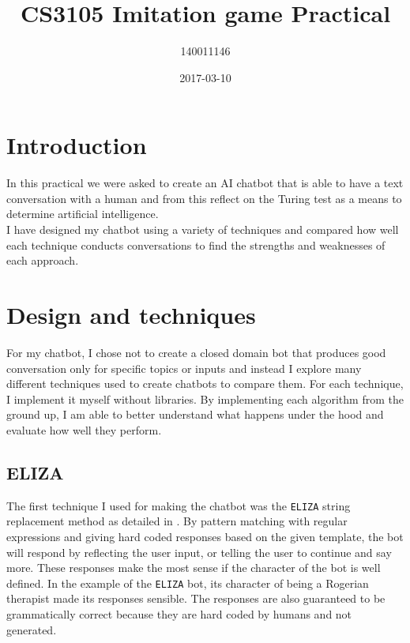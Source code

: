 \documentclass{article}
\title{CS3105 Imitation game Practical}
\date{2017-03-10}
\author{140011146}
\newcommand{\n}[0]{\\[\baselineskip]}
\begin{document}
\maketitle



\section{Introduction}
In this practical we were asked to create an AI chatbot that is able to have a text conversation with a human and from this reflect on the Turing test as a means to determine artificial intelligence.
\n
I have designed my chatbot using a variety of techniques and compared how well each technique conducts conversations to find the strengths and weaknesses of each approach.
\section{Design and techniques}
For my chatbot, I chose not to create a closed domain bot that produces good conversation only for specific topics or inputs and instead I explore many different techniques used to create chatbots to compare them. For each technique, I implement it myself without libraries. By implementing each algorithm from the ground up, I am able to better understand what happens under the hood and evaluate how well they perform.
\subsection{ELIZA}
The first technique I used for making the chatbot was the \texttt{ELIZA} string replacement method as detailed in \cite{eliza}. By pattern matching with regular expressions and giving hard coded responses based on the given template, the bot will respond by reflecting the user input, or telling the user to continue and say more. These responses make the most sense if the character of the bot is well defined. In the example of the \texttt{ELIZA} bot, its character of being a Rogerian therapist made its responses sensible. The responses are also guaranteed to be grammatically correct because they are hard coded by humans and not generated. 
\end{document}
